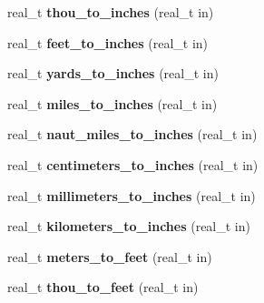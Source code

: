 \begin{DoxyCompactItemize}
\item 
\hypertarget{namespaceetk_acfd01f0b4409adc6187bc70151448ef3}{real\-\_\-t {\bfseries thou\-\_\-to\-\_\-inches} (real\-\_\-t in)}\label{namespaceetk_acfd01f0b4409adc6187bc70151448ef3}

\item 
\hypertarget{namespaceetk_ac10aa6a71da561e922bdce3692f463ff}{real\-\_\-t {\bfseries feet\-\_\-to\-\_\-inches} (real\-\_\-t in)}\label{namespaceetk_ac10aa6a71da561e922bdce3692f463ff}

\item 
\hypertarget{namespaceetk_aca3201b91cb8eaf56e1bbe0dc778132a}{real\-\_\-t {\bfseries yards\-\_\-to\-\_\-inches} (real\-\_\-t in)}\label{namespaceetk_aca3201b91cb8eaf56e1bbe0dc778132a}

\item 
\hypertarget{namespaceetk_abe12d6354c9043009d0fb7b470b89f7a}{real\-\_\-t {\bfseries miles\-\_\-to\-\_\-inches} (real\-\_\-t in)}\label{namespaceetk_abe12d6354c9043009d0fb7b470b89f7a}

\item 
\hypertarget{namespaceetk_a4ad9b88c07f187bc033e70b1e7001158}{real\-\_\-t {\bfseries naut\-\_\-miles\-\_\-to\-\_\-inches} (real\-\_\-t in)}\label{namespaceetk_a4ad9b88c07f187bc033e70b1e7001158}

\item 
\hypertarget{namespaceetk_ad0659533f713fea578f0939aadcded22}{real\-\_\-t {\bfseries centimeters\-\_\-to\-\_\-inches} (real\-\_\-t in)}\label{namespaceetk_ad0659533f713fea578f0939aadcded22}

\item 
\hypertarget{namespaceetk_a25beede35ab81e94f6e156a532aebe15}{real\-\_\-t {\bfseries millimeters\-\_\-to\-\_\-inches} (real\-\_\-t in)}\label{namespaceetk_a25beede35ab81e94f6e156a532aebe15}

\item 
\hypertarget{namespaceetk_a399a9846243439060bf890d03a74e03d}{real\-\_\-t {\bfseries kilometers\-\_\-to\-\_\-inches} (real\-\_\-t in)}\label{namespaceetk_a399a9846243439060bf890d03a74e03d}

\item 
\hypertarget{namespaceetk_aeb8f787ac7912d65c22282909ca4efcd}{real\-\_\-t {\bfseries meters\-\_\-to\-\_\-feet} (real\-\_\-t in)}\label{namespaceetk_aeb8f787ac7912d65c22282909ca4efcd}

\item 
\hypertarget{namespaceetk_a229f52a8dbe9fb43c8a69c7006ee0f0e}{real\-\_\-t {\bfseries thou\-\_\-to\-\_\-feet} (real\-\_\-t in)}\label{namespaceetk_a229f52a8dbe9fb43c8a69c7006ee0f0e}


\end{DoxyCompactItemize}
